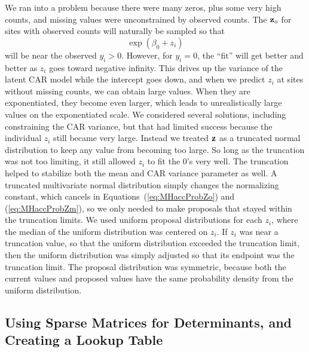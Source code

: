 \documentclass[11pt, titlepage]{article}
\begin{document}
\begin{flushleft}
\begin{onehalfspace}
We ran into a problem because there were many zeros, plus some very high counts, and missing values were unconstrained by observed counts.  The $\mathbf{z}_{o}$ for sites with observed counts will naturally be sampled so that 
$$
\exp(\beta_{0} + z_{i})
$$
will be near the observed $y_{i} > 0$. However, for $y_{i} = 0$, the ``fit'' will get better and better as $z_{i}$ goes toward negative infinity. This drives up the variance of the latent CAR model while the intercept goes down, and when we predict $z_{i}$ at sites without missing counts, we can obtain large values.  When they are exponentiated, they become even larger, which leads to unrealistically large values on the exponentiated scale.  We considered several solutions, including constraining the CAR variance, but that had limited success because the individual $z_{i}$ still became very large. Instead we treated $\mathbf{z}$ as a truncated normal distribution to keep any value from becoming too large.  So long as the truncation was not too limiting, it still allowed $z_{i}$ to fit the 0's very well.  The truncation helped to stabilize both the mean and CAR variance parameter as well.  A truncated multivariate normal distribution simply changes the normalizing constant, which  cancels in Equations~(\ref{eq:MHaccProbZo}) and (\ref{eq:MHaccProbZm}), so we only needed to make proposals that stayed within the truncation limits.  We used uniform proposal distributions for each $z_{i}$, where the median of the uniform distribution was centered on $z_{i}$. If $z_{i}$ was near a truncation value, so that the uniform distribution exceeded the truncation limit, then the uniform distribution was simply adjusted so that its endpoint was the truncation limit.  The proposal distribution was symmetric, because both the current values and proposed values have the same probability density from the uniform distribution.


\subsection*{Using Sparse Matrices for Determinants, and Creating a Lookup Table}


\end{onehalfspace}
\end{flushleft}
\end{document}
